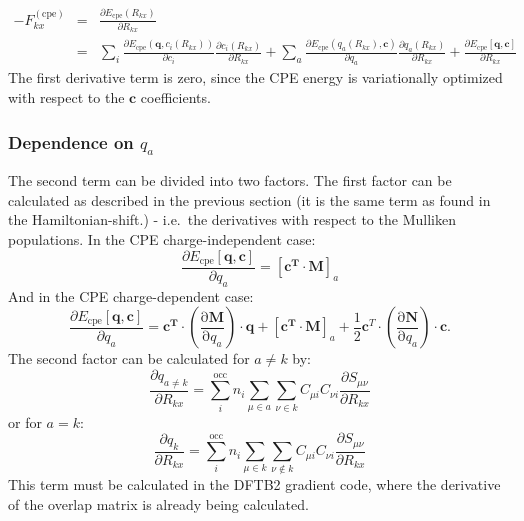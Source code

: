\documentclass{article}
\numberwithin{equation}{section}
\begin{document}
\begin{eqnarray}
    -F_{kx}^\mathrm{(cpe)} &=& \frac{\partial E_\mathrm{{cpe}}\left(R_{kx}\right)}{\partial R_{kx}} \nonumber\\
    &=& \sum_i \frac{\partial E_\mathrm{{cpe}}\left(\mathbf{q}, c_{i}(R_{kx})\right)}{\partial c_{i}}    
    \frac{\partial c_{i}(R_{kx})}{\partial R_{kx}} 
    + \sum_a \frac{\partial E_\mathrm{{cpe}}\left(q_a(R_{kx}), \mathbf{c}\right)}{\partial q_a}    
    \frac{\partial q_a(R_{kx})}{\partial R_{kx}} 
    + \frac{\partial E_\mathrm{{cpe}}\left[\mathbf{q}, \mathbf{c}\right]}{\partial R_{kx}}
\end{eqnarray}
The first derivative term is zero, since the CPE energy is variationally optimized with respect to the $\mathbf{c}$ coefficients. 
\subsubsection{Dependence on $q_a$}
The second term can be divided into two factors. The first factor can be calculated as described in the previous section (it is the same term as found in the Hamiltonian-shift.) - i.e.~the derivatives with respect to the Mulliken populations. 
In the CPE charge-independent case:
\begin{equation}
    \frac{\partial E_{\mathrm{cpe}}\left[\mathbf{q}, \mathbf{c}\right]}{\partial q_a} = [\mathbf{c^T}  \cdot \mathbf{M}]_a
\end{equation}
And in the CPE charge-dependent case:
\begin{equation}
    \frac{\partial E_{\mathrm{cpe}}\left[\mathbf{q}, \mathbf{c}\right]}{\partial q_a} = 
    \mathbf{c^T} \cdot \left( \frac{\mathrm{\partial}\mathbf{M}}{\mathrm{\partial}q_a}\right) \cdot \mathbf{q} 
    + [\mathbf{c^T}  \cdot \mathbf{M}]_a + \frac{1}{2}\mathbf{c}^T \cdot \left( \frac{\mathrm{\partial}\mathbf{N}}{\mathrm{\partial}q_a}\right) \cdot \mathbf{c}. 
\end{equation}
The second factor can be calculated for $a \neq k$ by:\cite{dftb3}
\begin{equation}
    \frac{\partial q_{a\neq k}}{\partial R_{kx}} 
    = \sum_i^\mathrm{occ} n_i \sum_{\mu \in a} \sum_{\nu \in k}  C_{\mu i} C_{\nu i}\frac{\partial S_{\mu\nu}}{\partial R_{kx}}
\end{equation}
or for $a=k$:
\begin{equation}
    \frac{\partial q_{k}}{\partial R_{kx}} 
    = \sum_i^\mathrm{occ} n_i \sum_{\mu \in k} \sum_{\nu \not\in k}  C_{\mu i} C_{\nu i}\frac{\partial S_{\mu\nu}}{\partial R_{kx}}
\end{equation}
This term must be calculated in the DFTB2 gradient code, where the derivative of the overlap matrix is already being calculated.
\end{document}
